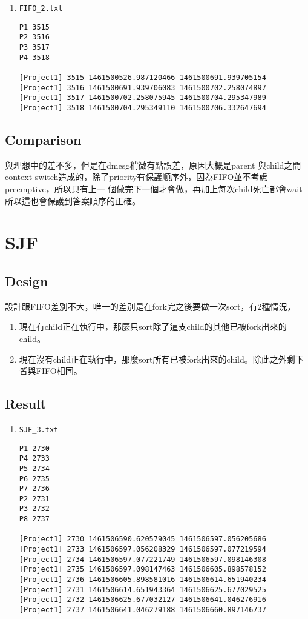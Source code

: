 \documentclass[12pt, a4paper]{article}
\begin{document}
\begin{enumerate}
\item \texttt{FIFO\_2.txt}
\begin{verbatim}
P1 3515
P2 3516
P3 3517
P4 3518

[Project1] 3515 1461500526.987120466 1461500691.939705154
[Project1] 3516 1461500691.939706083 1461500702.258074897
[Project1] 3517 1461500702.258075945 1461500704.295347989
[Project1] 3518 1461500704.295349110 1461500706.332647694
\end{verbatim}
\end{enumerate}

\subsection{Comparison}
與理想中的差不多，但是在dmesg稍微有點誤差，原因大概是parent 與child之間context
switch造成的，除了priority有保護順序外，因為FIFO並不考慮preemptive，所以只有上一
個做完下一個才會做，再加上每次child死亡都會wait所以這也會保護到答案順序的正確。

\section{SJF}

\subsection{Design}
設計跟FIFO差別不大，唯一的差別是在fork完之後要做一次sort，有2種情況，
\begin{enumerate}
\item 現在有child正在執行中，那麼只sort除了這支child的其他已被fork出來的child。
\item 現在沒有child正在執行中，那麼sort所有已被fork出來的child。除此之外剩下皆與FIFO相同。
\end{enumerate}

\subsection{Result}
\begin{enumerate}
\item \texttt{SJF\_3.txt}
\begin{verbatim}
P1 2730
P4 2733
P5 2734
P6 2735
P7 2736
P2 2731
P3 2732
P8 2737

[Project1] 2730 1461506590.620579045 1461506597.056205686
[Project1] 2733 1461506597.056208329 1461506597.077219594
[Project1] 2734 1461506597.077221749 1461506597.098146308
[Project1] 2735 1461506597.098147463 1461506605.898578152
[Project1] 2736 1461506605.898581016 1461506614.651940234
[Project1] 2731 1461506614.651943364 1461506625.677029525
[Project1] 2732 1461506625.677032127 1461506641.046276916
[Project1] 2737 1461506641.046279188 1461506660.897146737
\end{verbatim}
\end{enumerate}
\end{document}
